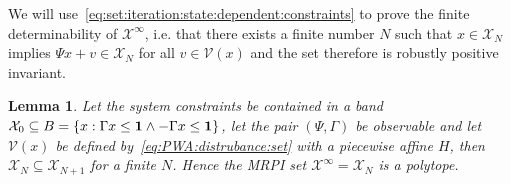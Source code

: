 \documentclass[letterpaper, 10pt, conference]{ieeeconf} %
\newtheorem{thm}{Lemma}[section]
\begin{document}
%
We will use~\eqref{eq:set:iteration:state:dependent:constraints} to prove the finite determinability of
$\mathcal X^\infty$, i.e. that there exists a finite number $N$ such that $x\in\mathcal X_N$ implies
$\Psi x + v \in\mathcal X_N$ for all $v\in\mathcal V(x)$ and the set therefore is robustly positive invariant.
%
\begin{thm}\label{thm:finite:MRPI:set:state:dependable}
Let the system constraints be contained in a band $\mathcal X_0\subseteq B=\{x:\Gamma x\leq{\bf{1}}\wedge 
-\Gamma x\leq{\bf{1}}\}$, let the pair $(\Psi,\Gamma)$ be observable and let $\mathcal V(x)$ be defined by~\eqref{eq:PWA:distrubance:set}
with a piecewise affine $H$, 
then $\mathcal X_N\subseteq \mathcal X_{N+1}$ for a finite $N$. Hence the MRPI set $\mathcal X^\infty 
=\mathcal X_N$ is a polytope.
\end{thm}
%
\end{document}
